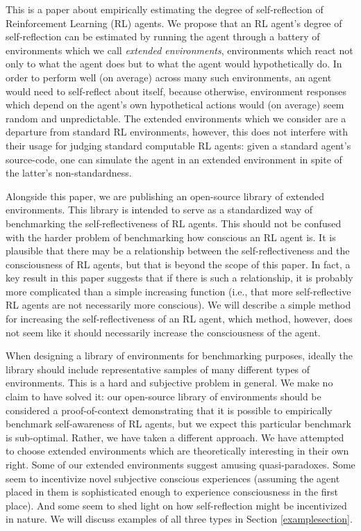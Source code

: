 \documentclass{article}
\begin{document}
This is a paper about empirically estimating the degree of self-reflection of
Reinforcement Learning (RL) agents. We propose that an RL agent's degree of self-reflection
can be estimated by running the agent through a battery of environments which we call
\emph{extended environments}, environments which react not only to what the agent does
but to what the agent would hypothetically do. In order to perform well (on average)
across many such environments, an agent would need to self-reflect about itself, because
otherwise, environment responses which depend on the agent's own hypothetical actions
would (on average) seem random and unpredictable. The extended environments which we
consider are a departure from standard RL environments, however, this does not interfere
with their usage for judging standard computable RL agents: given a standard agent's
source-code, one can simulate the agent in an extended environment in spite of the
latter's non-standardness.

Alongside this paper, we are publishing an open-source library of extended
environments. This library is intended to serve as a standardized way of
benchmarking the self-reflectiveness of RL agents. This should not be confused
with the harder problem of benchmarking how conscious an RL agent is. It is
plausible that there may be a relationship between the self-reflectiveness and
the consciousness of RL agents, but that is beyond the scope of this paper.
In fact, a key result in this paper suggests that if there is such a relationship,
it is probably more complicated than a simple increasing function (i.e., that
more self-reflective RL agents are not necessarily more conscious). We will describe
a simple method for increasing the self-reflectiveness of an RL agent, which method,
however, does not seem like it should necessarily increase the consciousness of
the agent.

When designing a library of environments for benchmarking purposes, ideally the
library should include representative samples of many different types of
environments. This is a hard and subjective problem in general. We make no claim to have solved
it: our open-source library of environments should be considered a proof-of-context
demonstrating that it is possible to empirically benchmark self-awareness of RL
agents, but we expect this particular benchmark is sub-optimal.
Rather, we have taken a different approach.
We have attempted to choose extended environments which are theoretically
interesting in their own right. Some of our extended environments
suggest amusing quasi-paradoxes. Some seem to incentivize novel subjective conscious
experiences (assuming the agent placed in them is sophisticated enough to experience
consciousness in the first place). And some seem to shed light on how self-reflection
might be incentivized in nature. We will discuss examples of all three types in
Section \ref{examplesection}.
\end{document}
